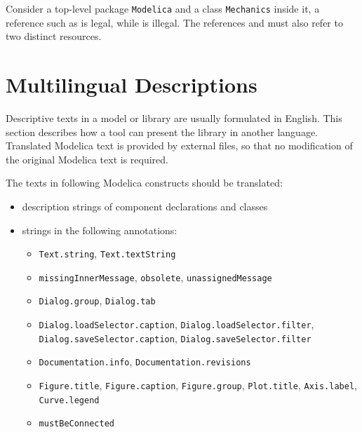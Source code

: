 \begin{example}
Consider a top-level package \lstinline!Modelica! and a class \lstinline!Mechanics! inside it, a reference such as  is legal, while  is illegal.
The references  and  must also refer to two distinct resources.
\end{example}


\section{Multilingual Descriptions}\label{multilingual-descriptions}

\begin{nonnormative}
Descriptive texts in a model or library are usually formulated in English.
This section describes how a tool can present the library in another language.
Translated Modelica text is provided by external files, so that no modification of the original Modelica text is required.
\end{nonnormative}

The texts in following Modelica constructs should be translated:
\begin{itemize}
\item description strings of component declarations and classes
\item strings in the following annotations:
\begin{itemize}
\item \lstinline!Text.string!, \lstinline!Text.textString!
\item \lstinline!missingInnerMessage!, \lstinline!obsolete!, \lstinline!unassignedMessage!
\item \lstinline!Dialog.group!, \lstinline!Dialog.tab!
\item
  \lstinline!Dialog.loadSelector.caption!, \lstinline!Dialog.loadSelector.filter!,
  \ifpdf\\\else\fi%
  \lstinline!Dialog.saveSelector.caption!, \lstinline!Dialog.saveSelector.filter!
\item \lstinline!Documentation.info!, \lstinline!Documentation.revisions!
\item \lstinline!Figure.title!, \lstinline!Figure.caption!, \lstinline!Figure.group!, \lstinline!Plot.title!, \lstinline!Axis.label!, \lstinline!Curve.legend!
\item \lstinline!mustBeConnected!
\end{itemize}
\end{itemize}

